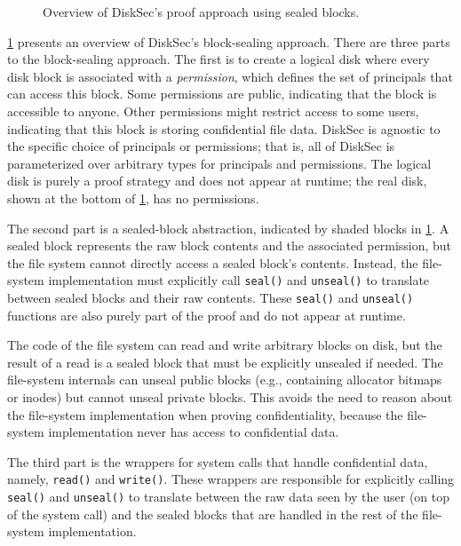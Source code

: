 \begin{figure}[ht]
  \centering
  \scalebox{0.8}{
  }
  \caption{Overview of DiskSec's proof approach using sealed blocks.}
  \label{fig:sealing}
\end{figure}

\ref{fig:sealing} presents an overview of DiskSec's block-sealing
approach.  There are three parts to the block-sealing approach.  The first
is to create a logical disk where every disk block is associated with a
\emph{permission}, which defines the set of principals that can access
this block.  Some permissions are public, indicating that the block is
accessible to anyone.  Other permissions might restrict access to some
users, indicating that this block is storing confidential file data.
DiskSec is agnostic to the specific choice of principals or permissions;
that is, all of DiskSec is parameterized over arbitrary types for
principals and permissions.  The logical disk is purely a proof strategy
and does not appear at runtime; the real disk, shown at the bottom of
\ref{fig:sealing}, has no permissions.

The second part is a sealed-block abstraction, indicated by shaded
blocks in \ref{fig:sealing}.  A sealed block represents the raw
block contents and the associated permission, but the file system cannot
directly access a sealed block's contents.  Instead, the file-system
implementation must explicitly call \texttt{seal()} and \texttt{unseal()} to
translate between sealed blocks and their raw contents.  These \texttt{seal()}
and \texttt{unseal()} functions are also purely part of the proof and do
not appear at runtime.

The code of the file system can read and write arbitrary blocks on
disk, but the result of a read is a sealed block that must be explicitly unsealed
if needed.  The file-system internals can unseal public blocks (e.g.,
containing allocator bitmaps or inodes) but cannot unseal private blocks.
This avoids the need to reason about the file-system implementation when
proving confidentiality, because the file-system implementation never
has access to confidential data.

The third part is the wrappers for system calls that handle confidential
data, namely, \texttt{read()} and \texttt{write()}.  These wrappers are responsible
for explicitly calling \texttt{seal()} and \texttt{unseal()} to translate between
the raw data seen by the user (on top of the system call) and the sealed
blocks that are handled in the rest of the file-system implementation.

